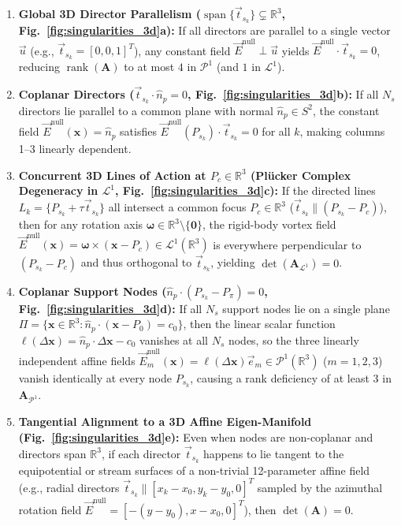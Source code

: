 \documentclass[preprint,12pt]{elsarticle}
\newcommand{\R}{\mathbb{R}}
\begin{document}
\begin{enumerate}
    \item \textbf{Global 3D Director Parallelism ($\operatorname{span}\{\vec{t}_{s_k}\} \subsetneq \R^3$, Fig.~\ref{fig:singularities_3d}a):} If all directors are parallel to a single vector $\vec{u}$ (e.g., $\vec{t}_{s_k} = [0,0,1]^T$), any constant field $\vec{E}^{\text{null}} \perp \vec{u}$ yields $\vec{E}^{\text{null}}\cdot\vec{t}_{s_k} = 0$, reducing $\operatorname{rank}(\mathbf{A})$ to at most $4$ in $\mathcal{P}^1$ (and $1$ in $\mathcal{L}^1$).
    \item \textbf{Coplanar Directors ($\vec{t}_{s_k} \cdot \hat{n}_p = 0$, Fig.~\ref{fig:singularities_3d}b):} If all $N_s$ directors lie parallel to a common plane with normal $\hat{n}_p \in S^2$, the constant field $\vec{E}^{\text{null}}(\mathbf{x}) = \hat{n}_p$ satisfies $\vec{E}^{\text{null}}(P_{s_k})\cdot\vec{t}_{s_k} = 0$ for all $k$, making columns 1--3 linearly dependent.
    \item \textbf{Concurrent 3D Lines of Action at $P_c \in \R^3$ (Pl\"{u}cker Complex Degeneracy in $\mathcal{L}^1$, Fig.~\ref{fig:singularities_3d}c):} If the directed lines $L_k = \{P_{s_k} + \tau\vec{t}_{s_k}\}$ all intersect a common focus $P_c \in \R^3$ ($\vec{t}_{s_k} \parallel (P_{s_k} - P_c)$), then for any rotation axis $\bm{\omega} \in \R^3 \setminus \{\mathbf{0}\}$, the rigid-body vortex field $\vec{E}^{\text{null}}(\mathbf{x}) = \bm{\omega} \times (\mathbf{x} - P_c) \in \mathcal{L}^1(\R^3)$ is everywhere perpendicular to $(P_{s_k} - P_c)$ and thus orthogonal to $\vec{t}_{s_k}$, yielding $\det(\mathbf{A}_{\mathcal{L}^1}) = 0$.
    \item \textbf{Coplanar Support Nodes ($\hat{n}_p \cdot (P_{s_k} - P_\pi) = 0$, Fig.~\ref{fig:singularities_3d}d):} If all $N_s$ support nodes lie on a single plane $\Pi = \{\mathbf{x} \in \R^3 : \hat{n}_p \cdot (\mathbf{x} - P_0) = c_0\}$, then the linear scalar function $\ell(\Delta\mathbf{x}) = \hat{n}_p \cdot \Delta\mathbf{x} - c_0$ vanishes at all $N_s$ nodes, so the three linearly independent affine fields $\vec{E}^{\text{null}}_{m}(\mathbf{x}) = \ell(\Delta\mathbf{x})\vec{e}_m \in \mathcal{P}^1(\R^3)$ ($m=1,2,3$) vanish identically at every node $P_{s_k}$, causing a rank deficiency of at least $3$ in $\mathbf{A}_{\mathcal{P}^1}$.
    \item \textbf{Tangential Alignment to a 3D Affine Eigen-Manifold (Fig.~\ref{fig:singularities_3d}e):} Even when nodes are non-coplanar and directors span $\R^3$, if each director $\vec{t}_{s_k}$ happens to lie tangent to the equipotential or stream surfaces of a non-trivial 12-parameter affine field (e.g., radial directors $\vec{t}_{s_k} \parallel [x_k - x_0, y_k - y_0, 0]^T$ sampled by the azimuthal rotation field $\vec{E}^{\text{null}} = [-(y-y_0), x-x_0, 0]^T$), then $\det(\mathbf{A}) = 0$.
\end{enumerate}
\end{document}
